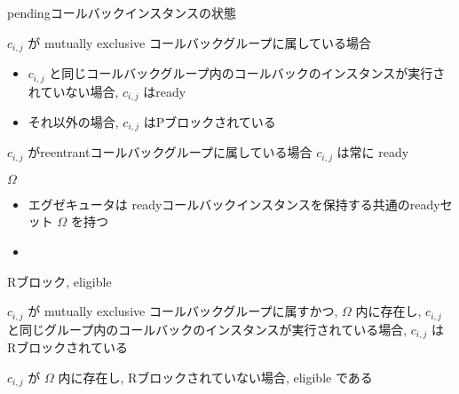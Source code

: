 \begin{frame}{pendingコールバックインスタンスの状態}
    \begin{block}{$c_{i, j}$ が mutually exclusive コールバックグループに属している場合}
        \setlength{\linewidth}{0.98\columnwidth}
        \begin{itemize}
            \item $c_{i, j}$ と同じコールバックグループ内のコールバックのインスタンスが実行されていない場合, $c_{i, j}$ はready
            \item それ以外の場合, $c_{i, j}$ はPブロックされている
        \end{itemize}
    \end{block}
    \begin{block}{$c_{i, j}$ がreentrantコールバックグループに属している場合}
        $c_{i, j}$ は常に ready
    \end{block}
\end{frame}

\begin{frame}{$\Omega$}
    \begin{itemize}
        \item エグゼキュータは readyコールバックインスタンスを保持する共通のreadyセット $\Omega$ を持つ
        \item {}
    \end{itemize}
\end{frame}

\begin{frame}{Rブロック, eligible}
    \begin{definition}[Rブロック]
        $c_{i, j}$ が mutually exclusive コールバックグループに属すかつ, $\Omega$ 内に存在し, $c_{i, j}$ と同じグループ内のコールバックのインスタンスが実行されている場合, $c_{i, j}$ は Rブロックされている
    \end{definition}
    \begin{definition}[eligible]
        $c_{i, j}$ が $\Omega$ 内に存在し, Rブロックされていない場合, eligible である
    \end{definition}
\end{frame}

